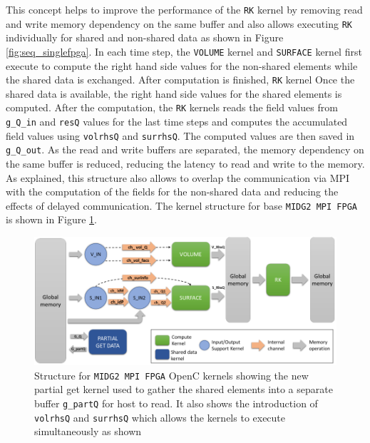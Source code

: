 This concept helps to improve the performance of the \texttt{RK} kernel
by removing read and write memory dependency on the same buffer and also allows executing
\texttt{RK} individually for shared and non-shared data as shown in Figure \ref{fig:seq_singlefpga}.
In each time step, the \texttt{VOLUME} kernel and \texttt{SURFACE} kernel first execute to compute the right hand side values for the
non-shared elements while the shared data is exchanged. After computation is finished, \texttt{RK} kernel Once the shared data is available,
the right hand side values for the shared elements is computed. After the computation,
the \texttt{RK} kernels reads the field values from \texttt{g\_Q\_in} and \texttt{resQ} values
for the last time steps and computes the accumulated field values using
\texttt{volrhsQ} and \texttt{surrhsQ}. The computed values are then saved in \texttt{g\_Q\_out}.
As the read and write buffers are separated, the memory dependency on the same buffer is reduced,
reducing the latency to read and write to the memory. As explained, this structure also allows
to overlap the communication via MPI with the computation of the fields for the non-shared data
and reducing the effects of delayed communication. The kernel structure for base \texttt{MIDG2 MPI FPGA}
is shown in Figure \ref{fig:base_kernstruc}.
\begin{figure}[ht]%
    \centering
    \includegraphics[width=1.0\textwidth]{images/base_kernstruc}
    \caption{Structure for \texttt{MIDG2 MPI FPGA} OpenC kernels showing the new partial get kernel used to gather
     the shared elements into a separate buffer \texttt{g\_partQ} for host to read. It also shows the introduction
     of \texttt{volrhsQ} and \texttt{surrhsQ} which allows the kernels to execute simultaneously as shown}
    \label{fig:base_kernstruc}
\end{figure}